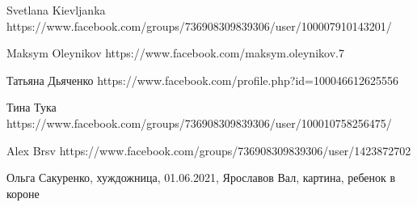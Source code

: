  
 
 
 
 
Svetlana Kievljanka
https://www.facebook.com/groups/736908309839306/user/100007910143201/

Maksym Oleynikov
https://www.facebook.com/maksym.oleynikov.7

Татьяна Дьяченко
https://www.facebook.com/profile.php?id=100046612625556

Тина Тука
https://www.facebook.com/groups/736908309839306/user/100010758256475/

Alex Brsv
https://www.facebook.com/groups/736908309839306/user/1423872702

Ольга Сакуренко, хуждожница, 01.06.2021, Ярославов Вал, картина, ребенок в короне
